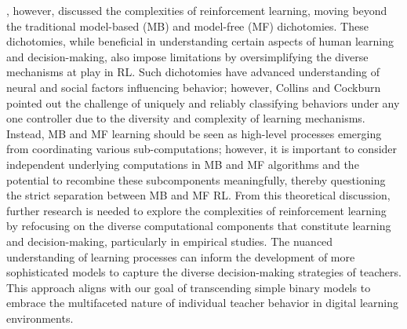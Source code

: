 \documentclass[
  number,
  preprint,
  3p,
  onecolumn]{elsarticle}
\begin{document}
\citep{collins2020}, however, discussed the complexities of
reinforcement learning, moving beyond the traditional model-based (MB)
and model-free (MF) dichotomies. These dichotomies, while beneficial in
understanding certain aspects of human learning and decision-making,
also impose limitations by oversimplifying the diverse mechanisms at
play in RL. Such dichotomies have advanced understanding of neural and
social factors influencing behavior; however, Collins and Cockburn
pointed out the challenge of uniquely and reliably classifying behaviors
under any one controller due to the diversity and complexity of learning
mechanisms. Instead, MB and MF learning should be seen as high-level
processes emerging from coordinating various sub-computations; however,
it is important to consider independent underlying computations in MB
and MF algorithms and the potential to recombine these subcomponents
meaningfully, thereby questioning the strict separation between MB and
MF RL. From this theoretical discussion, further research is needed to
explore the complexities of reinforcement learning by refocusing on the
diverse computational components that constitute learning and
decision-making, particularly in empirical studies. The nuanced
understanding of learning processes can inform the development of more
sophisticated models to capture the diverse decision-making strategies
of teachers. This approach aligns with our goal of transcending simple
binary models to embrace the multifaceted nature of individual teacher
behavior in digital learning environments.
\end{document}
